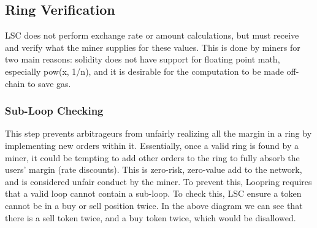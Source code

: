 \documentclass[UTF8,nofonts]{article}
\begin{document}
\subsection{Ring Verification}

LSC does not perform exchange rate or amount calculations, but must receive and verify what the miner supplies for these values. This is done by miners for two main reasons: solidity does not have support for floating point math, especially pow(x, 1/n), and it is desirable for the computation to be made off-chain to save gas.

\subsubsection{Sub-Loop Checking}
This step prevents arbitrageurs from unfairly realizing all the margin in a ring by implementing new orders within it. Essentially, once a valid ring is found by a miner, it could be tempting to add other orders to the ring to fully absorb the users' margin (rate discounts). This is zero-risk, zero-value add to the network, and is considered unfair conduct by the miner. To prevent this, Loopring requires that a valid loop cannot contain a sub-loop. To check this, LSC ensure a token cannot be in a buy or sell position twice. In the above diagram we can see that there is a sell token twice, and a buy token twice, which would be disallowed. 
\end{document}
